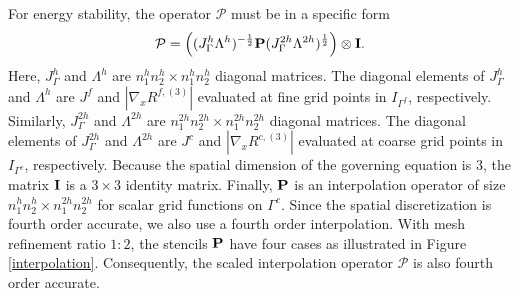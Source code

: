 For energy stability, the operator ${\mathcal{P}}$ must be in a specific form
\[{\mathcal{P}} = \left(({J}^h_\Gamma {\Lambda}^h)^{-\frac{1}{2}}{\bf P}({J}^{2h}_\Gamma {\Lambda}^{2h})^{\frac{1}{2}}\right)\otimes{\bf I}.\]
Here, $J_{\Gamma}^h$ and $\Lambda^h$ are $n_1^{h}n_2^{h}\times n_1^{h}n_2^{h}$ diagonal matrices. The diagonal elements of $J_{\Gamma}^h$ and $\Lambda^{h}$ are $J^f$ and $|\nabla_x R^{f,(3)}|$ evaluated at fine grid points in $I_{\Gamma^f}$, respectively. Similarly, ${J}_{\Gamma}^{2h}$ and ${{\Lambda}^{2h}}$ are $n_1^{2h}n_2^{2h}\times n_1^{2h}n_2^{2h}$ diagonal matrices. The diagonal elements of $J_{\Gamma}^{2h}$ and $\Lambda^{2h}$ are $J^c$ and $|\nabla_x R^{c,(3)}|$ evaluated at coarse grid points in $I_{\Gamma^c}$, respectively. Because the spatial dimension of the governing equation is 3, the matrix ${\bf I}$ is a $3\times 3$ identity matrix. Finally, ${\bf P}$ is an interpolation operator of size $n_1^hn_2^h\times n_1^{2h}n_2^{2h}$ for scalar grid functions on $\Gamma^c$. Since the spatial discretization is fourth order accurate, we also use a fourth order interpolation. With mesh refinement ratio  $1:2$, the stencils ${\bf P}$ have four cases as illustrated in  Figure \ref{interpolation}. Consequently, the scaled interpolation operator $\mathcal{P}$ is also fourth order accurate.

